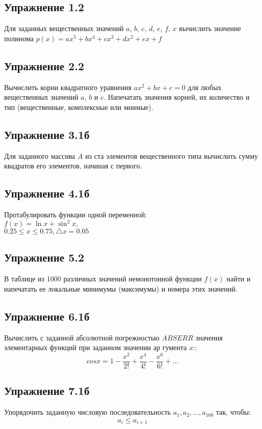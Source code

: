 \documentclass[12pt,a4paper]{scrartcl}
\begin{document}
\subsection*{Упражнение 1.2}
\noindent
Для заданных вещественных значений $a$, $b$, $c$, $d$, $e$, $f$, $x$ вычислить значение полинома $p(x)=ax^5+bx^4+cx^3+dx^2+ex+f$
\subsection*{Упражнение 2.2}
\noindent
Вычислить корни квадратного уравнения $ax^2+bx+c=0$ для любых вещественных значений $a$, $b$ и $c$. Напечатать значения корней, их количество и тип (вещественные, комплексные или мнимые).

\subsection*{Упражнение 3.1б}
\noindent
Для заданного массива $A$ из ста элементов вещественного типа вычислить сумму квадратов его элементов, начиная с первого.
  
\subsection*{Упражнение 4.1б}
\noindent
Протабулировать функции одной переменной:\\[2mm]
    $ f(x) = \ln x  +\sin^2 x,$\\
    $0.25 \leq x \leq 0.75,\triangle x = 0.05 $

\subsection*{Упражнение 5.2}
\noindent
В таблице из 1000 различных значений немонотонной функции $ f(x) $ найти и напечатать ее локальные минимумы (максимумы) и номера этих значений.

\subsection*{Упражнение 6.1б}
\noindent
Вычислить с заданной абсолютной погрежностью $ABSERR$ значения элементарных функций при заданном значении ар гумента $x$::\\[2mm]
    $$ cos x = 1 - \frac{x^2}{2!} + \frac{x^4}{4!} - \frac{x^6}{6!} + ...$$
    
\subsection*{Упражнение 7.1б}
\noindent
Упорядочить заданную числовую последовательность $a_1,a_2, ...,a_{100}$ так, чтобы:
$$a_i \leq a_{i+1}$$
\end{document}
